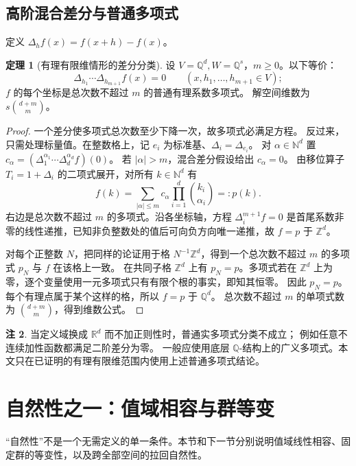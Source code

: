\documentclass[UTF8,11pt,a4paper]{ctexart}
\theoremstyle{definition}
\newtheorem{theorem}{定理}[section]
\newtheorem{remark}[theorem]{注}
\newcommand{\Q}{\mathbb Q}
\newcommand{\R}{\mathbb R}
\newcommand{\Z}{\mathbb Z}
\newcommand{\N}{\mathbb N}
\begin{document}
\subsection{高阶混合差分与普通多项式}
定义 $\Delta_hf(x)=f(x+h)-f(x)$。
\begin{theorem}[有理有限维情形的差分分类]\label{thm:polydifference}
设 $V=\Q^d,W=\Q^s$，$m\ge0$。以下等价：
\[
 \Delta_{h_1}\cdots\Delta_{h_{m+1}}f(x)=0
 \qquad(x,h_1,\ldots,h_{m+1}\in V);
\]
$f$ 的每个坐标是总次数不超过 $m$ 的普通有理系数多项式。
解空间维数为 $s\binom{d+m}{m}$。
\end{theorem}
\begin{proof}
一个差分使多项式总次数至少下降一次，故多项式必满足方程。
反过来，只需处理标量值。在整数格上，记 $e_i$ 为标准基、$\Delta_i=\Delta_{e_i}$。
对 $\alpha\in\N^d$ 置 $c_\alpha=(\Delta_1^{\alpha_1}\cdots\Delta_d^{\alpha_d}f)(0)$。
若 $|\alpha|>m$，混合差分假设给出 $c_\alpha=0$。
由移位算子 $T_i=1+\Delta_i$ 的二项式展开，对所有 $k\in\N^d$ 有
\[
 f(k)=\sum_{|\alpha|\le m}c_\alpha
       \prod_{i=1}^d\binom{k_i}{\alpha_i}=:p(k).
\]
右边是总次数不超过 $m$ 的多项式。沿各坐标轴，方程 $\Delta_i^{m+1}f=0$ 是首尾系数非零的线性递推，已知非负整数处的值后可向负方向唯一递推，故 $f=p$ 于 $\Z^d$。

对每个正整数 $N$，把同样的论证用于格 $N^{-1}\Z^d$，得到一个总次数不超过 $m$ 的多项式 $p_N$ 与 $f$ 在该格上一致。
在共同子格 $\Z^d$ 上有 $p_N=p$。多项式若在 $\Z^d$ 上为零，逐个变量使用一元多项式只有有限个根的事实，即知其恒零。
因此 $p_N=p$。每个有理点属于某个这样的格，所以 $f=p$ 于 $\Q^d$。
总次数不超过 $m$ 的单项式数为 $\binom{d+m}{m}$，得到维数公式。
\end{proof}
\begin{remark}
当定义域换成 $\R^d$ 而不加正则性时，普通实多项式分类不成立；
例如任意不连续加性函数都满足二阶差分为零。
一般应使用底层 $\Q$-结构上的广义多项式。本文只在已证明的有理有限维范围内使用上述普通多项式结论。
\end{remark}

\section{自然性之一：值域相容与群等变}\label{sec:natural}
“自然性”不是一个无需定义的单一条件。本节和下一节分别说明值域线性相容、固定群的等变性，以及跨全部空间的拉回自然性。
\end{document}
